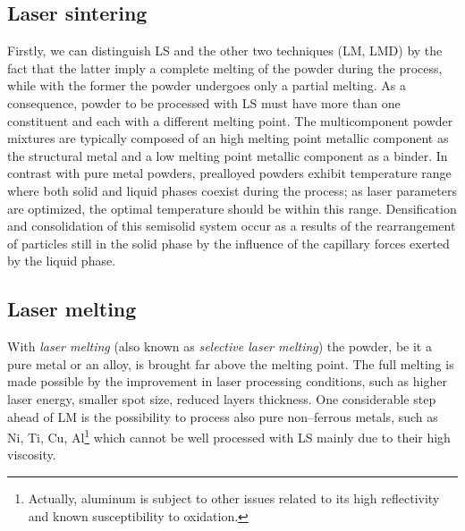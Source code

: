 \subsection{Laser sintering}
Firstly, we can distinguish LS and the other two techniques (LM, LMD) by the fact that the latter imply a complete melting of the powder during the process, while with the former the powder undergoes only a partial melting. As a consequence, powder to be processed with LS must have more than one constituent and each with a different melting point. The multicomponent powder mixtures are typically composed of an high melting point metallic component as the structural metal and a low melting point metallic component as a binder.
In contrast with pure metal powders, prealloyed powders exhibit temperature range where both solid and liquid phases coexist during the process; as laser parameters are optimized, the optimal temperature should be within this range. Densification and consolidation of this semisolid system occur as a results of the rearrangement of particles still in the solid phase by the influence of the capillary forces exerted by the liquid phase. %

\subsection{Laser melting\label{sub:LM}}
With \textit{laser melting} (also known as \textit{selective laser melting}) the powder, be it a pure metal or an alloy, is brought far above the melting point.
The full melting is made possible by the improvement in laser processing conditions, such as higher laser energy, smaller spot size, reduced layers thickness. One considerable step ahead of LM is the possibility to process also pure non--ferrous metals, such as Ni, Ti, Cu, Al\footnote{Actually, aluminum is subject to other issues related to its high reflectivity and known susceptibility to oxidation.} which cannot be well processed with LS mainly due to their high viscosity.

